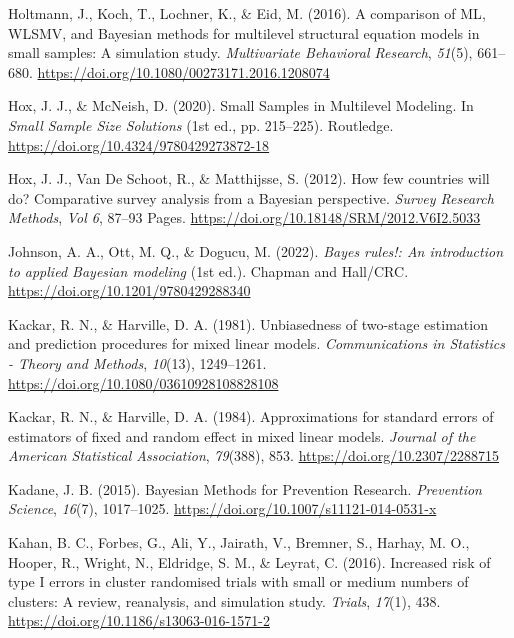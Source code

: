 \documentclass[
  letterpaper,
  11pt,
  english,
  singlespacing,
  headsepline,
  openany]{MastersDoctoralThesis}
\newlength{\cslhangindent}
\newenvironment{CSLReferences}[2] %
 {\begin{list}{}{%
  \setlength{\itemindent}{0pt}
  \setlength{\leftmargin}{0pt}
  \setlength{\parsep}{0pt}
  \ifodd #1
   \setlength{\leftmargin}{\cslhangindent}
   \setlength{\itemindent}{-1\cslhangindent}
  \fi
  \setlength{\itemsep}{#2\baselineskip}}}
 {\end{list}}
\begin{document}
\begin{CSLReferences}{1}{0}
Holtmann, J., Koch, T., Lochner, K., \& Eid, M. (2016). A comparison of
{ML}, {WLSMV}, and {Bayesian} methods for multilevel structural equation
models in small samples: A simulation study. \emph{Multivariate
Behavioral Research}, \emph{51}(5), 661--680.
\url{https://doi.org/10.1080/00273171.2016.1208074}

Hox, J. J., \& McNeish, D. (2020). Small {Samples} in {Multilevel
Modeling}. In \emph{Small {Sample Size Solutions}} (1st ed., pp.
215--225). Routledge. \url{https://doi.org/10.4324/9780429273872-18}

Hox, J. J., Van De Schoot, R., \& Matthijsse, S. (2012). How few
countries will do? {Comparative} survey analysis from a {Bayesian}
perspective. \emph{Survey Research Methods}, \emph{Vol 6}, 87--93 Pages.
\url{https://doi.org/10.18148/SRM/2012.V6I2.5033}

Johnson, A. A., Ott, M. Q., \& Dogucu, M. (2022). \emph{Bayes rules!:
{An} introduction to applied {Bayesian} modeling} (1st ed.). {Chapman
and Hall/CRC}. \url{https://doi.org/10.1201/9780429288340}

Kackar, R. N., \& Harville, D. A. (1981). Unbiasedness of two-stage
estimation and prediction procedures for mixed linear models.
\emph{Communications in Statistics - Theory and Methods}, \emph{10}(13),
1249--1261. \url{https://doi.org/10.1080/03610928108828108}

Kackar, R. N., \& Harville, D. A. (1984). Approximations for standard
errors of estimators of fixed and random effect in mixed linear models.
\emph{Journal of the American Statistical Association}, \emph{79}(388),
853. \url{https://doi.org/10.2307/2288715}

Kadane, J. B. (2015). Bayesian {Methods} for {Prevention Research}.
\emph{Prevention Science}, \emph{16}(7), 1017--1025.
\url{https://doi.org/10.1007/s11121-014-0531-x}

Kahan, B. C., Forbes, G., Ali, Y., Jairath, V., Bremner, S., Harhay, M.
O., Hooper, R., Wright, N., Eldridge, S. M., \& Leyrat, C. (2016).
Increased risk of type {I} errors in cluster randomised trials with
small or medium numbers of clusters: A review, reanalysis, and
simulation study. \emph{Trials}, \emph{17}(1), 438.
\url{https://doi.org/10.1186/s13063-016-1571-2}


\end{CSLReferences}
\end{document}
